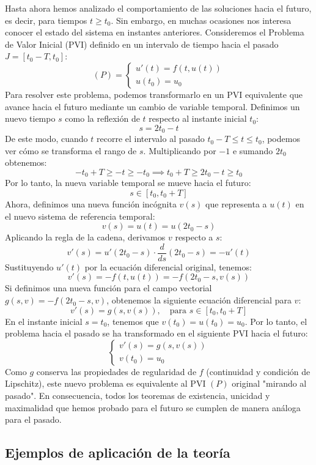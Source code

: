 Hasta ahora hemos analizado el comportamiento de las soluciones hacia el futuro, es decir, para tiempos $t \geq t_0$. Sin embargo, en muchas ocasiones nos interesa conocer el estado del sistema en instantes anteriores. Consideremos el Problema de Valor Inicial (PVI) definido en un intervalo de tiempo hacia el pasado $J = [t_0 - T, t_0]$:
\[
    (P) = 
    \begin{cases}
        u'(t) = f(t, u(t)) \\
        u(t_0) = u_0
    \end{cases}
\]
Para resolver este problema, podemos transformarlo en un PVI equivalente que avance hacia el futuro mediante un cambio de variable temporal. Definimos un nuevo tiempo $s$ como la reflexión de $t$ respecto al instante inicial $t_0$:
\[
    s = 2t_0 - t 
\]
De este modo, cuando $t$ recorre el intervalo al pasado $t_0 - T \leq t \leq t_0$, podemos ver cómo se transforma el rango de $s$. Multiplicando por $-1$ e sumando $2t_0$ obtenemos:
\[
    -t_0 + T \geq -t \geq -t_0 \implies t_0 + T \geq 2t_0 - t \geq t_0
\]
Por lo tanto, la nueva variable temporal se mueve hacia el futuro:
\[
    s \in [t_0, t_0 + T]
\]
Ahora, definimos una nueva función incógnita $v(s)$ que representa a $u(t)$ en el nuevo sistema de referencia temporal:
\[
    v(s) = u(t) = u(2t_0 - s)
\]
Aplicando la regla de la cadena, derivamos $v$ respecto a $s$:
\[
    v'(s) = u'(2t_0 - s) \cdot \frac{d}{ds}(2t_0 - s) = - u'(t)
\]
Sustituyendo $u'(t)$ por la ecuación diferencial original, tenemos:
\[
    v'(s) = - f(t, u(t)) = - f(2t_0 - s, v(s))
\]
Si definimos una nueva función para el campo vectorial $g(s, v) = - f(2t_0 - s, v)$, obtenemos la siguiente ecuación diferencial para $v$:
\[
    v'(s) = g(s, v(s)), \quad \text{para } s \in [t_0, t_0 + T]
\]
En el instante inicial $s = t_0$, tenemos que $v(t_0) = u(t_0) = u_0$. Por lo tanto, el problema hacia el pasado se ha transformado en el siguiente PVI hacia el futuro:
\[
    \begin{cases}
        v'(s) = g(s, v(s)) \\
        v(t_0) = u_0
    \end{cases}
\]
Como $g$ conserva las propiedades de regularidad de $f$ (continuidad y condición de Lipschitz), este nuevo problema es equivalente al PVI $(P)$ original "mirando al pasado". En consecuencia, todos los teoremas de existencia, unicidad y maximalidad que hemos probado para el futuro se cumplen de manera análoga para el pasado.

\subsection{Ejemplos de aplicación de la teoría}

